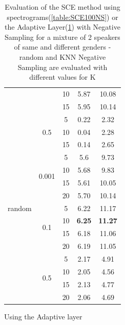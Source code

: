 \documentclass[master, tikz, final,11pt, dvipdfmx]{iscs-thesis}
\begin{document}
\begin{table}
\begin{subtable}{.5\linewidth}
\begin{tabular}{c|c|c|c|c}
\cline{3-5}
 &  & 10 & 5.87 & 10.08 \\
\cline{3-5}
 &  & 15 & 5.95 & 10.14 \\
\cline{2-5}
 & \multirow{3}{*}{0.5} & 5 & 0.22 & 2.32 \\
\cline{3-5}
 &  & 10 & 0.04 & 2.28 \\
\cline{3-5}
 &  & 15 & 0.14 & 2.65 \\
\hline
\multirow{9}{*}{random}  & \multirow{4}{*}{0.001} & 5 & 5.6 & 9.73 \\ 
\cline{3-5}
 &  & 10 & 5.68 & 9.83 \\
\cline{3-5}
 &  & 15 & 5.61 & 10.05 \\
\cline{3-5}
 &  & 20 & 5.70 & 10.14 \\
\cline{2-5}
 & \multirow{4}{*}{0.1} & 5 & 6.22 & 11.17 \\
\cline{3-5}
 &  & 10 & \textbf{6.25} & \textbf{11.27} \\
\cline{3-5}
 &  & 15 & 6.18 & 11.06 \\
\cline{3-5}
 &  & 20 & 6.19 & 11.05 \\
\cline{2-5}
 & \multirow{4}{*}{0.5} & 5 & 2.17 & 4.91 \\
\cline{3-5}
 &  & 10 & 2.05 & 4.56 \\
\cline{3-5}
 &  & 15 & 2.13 & 4.77 \\
\cline{3-5}
 &  & 20 & 2.06 & 4.69 \\
\end{tabular}
\caption{Using the Adaptive layer}
\label{table:ADAPTSCENS}
\end{subtable}
\caption{Evaluation of the SCE method using spectrograms(\ref{table:SCE100NS}) or the Adaptive Layer(\ref{table:ADAPTSCENS}) with Negative Sampling for a mixture of 2 speakers of same and different genders - random and KNN Negative Sampling are evaluated with different values for K}
\end{table}
\end{document}
